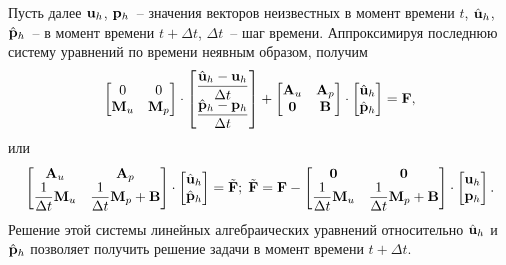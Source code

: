 Пусть далее $\mathbf{u}_h$, $\mathbf{p}_h$~-- значения векторов неизвестных в момент времени
$t$, $\Hat{\mathbf{u}}_h$, $\Hat{\mathbf{p}}_h$~-- в момент времени $t+\Delta t$, $\Delta t$~-- шаг времени.
Аппроксимируя последнюю систему уравнений по времени неявным образом, получим
%
\[
\displaystyle
\begin{bmatrix}
0 & 0 \\
\tn{M}_u & \tn{M}_p
\end{bmatrix} \cdot
%
\begin{bmatrix}
\displaystyle
\frac{ \Hat{\vc{u}}_h - \vc{u}_h }{\Delta t} \\
\displaystyle
\frac{ \Hat{\vc{p}}_h - \vc{p}_h }{\Delta t}
\end{bmatrix} + 
%
\begin{bmatrix}
\tn{A}_u & \tn{A}_p \\
\tn{0} & \tn{B}
\end{bmatrix} \cdot
%
\begin{bmatrix}
\Hat{\vc{u}}_h \\
\Hat{\vc{p}}_h
\end{bmatrix} = \vc{F},
%
\]
%
или
%
%
\begin{equation}
\label{eq:slae}
\displaystyle
\begin{bmatrix}
\tn{A}_u & \tn{A}_p \\
\displaystyle \frac{1}{\Delta t}\tn{M}_u & \displaystyle \frac{1}{\Delta t }\tn{M}_p + \tn{B}
\end{bmatrix} \cdot
%
\begin{bmatrix}
\Hat{\vc{u}}_h\\
\Hat{\vc{p}}_h
\end{bmatrix} = 
\Tilde{\vc{F}}; \;
%
\Tilde{\vc{F}} = 
\vc{F} - 
%
\begin{bmatrix}
\tn{0} & \tn{0} \\
\displaystyle \frac{1}{\Delta t}\tn{M}_u & \displaystyle \frac{1}{\Delta t }\tn{M}_p + \tn{B}
\end{bmatrix} \cdot
%
\begin{bmatrix}
\vc{u}_h \\
\vc{p}_h
\end{bmatrix}.
%
\end{equation}
%
Решение этой системы линейных алгебраических уравнений относительно $\Hat{\mathbf{u}}_h$ и
$\Hat{\mathbf{p}}_h$ позволяет получить решение задачи в момент времени $t+\Delta t$.

